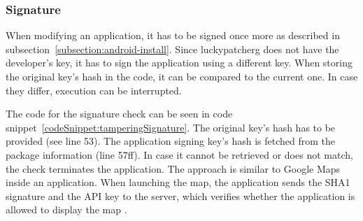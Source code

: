 \subsubsection{Signature} \label{subsection:counter-improve-tampering-signature}
When modifying an application, it has to be signed once more as described in subsection~\ref{subsection:android-install}.
Since \gls{luckypatcherg} does not have the developer’s key, it has to sign the application using a different key.
\newline
When storing the original key’s hash in the code, it can be compared to the current one.
In case they differ, execution can be interrupted.
\newline

The code for the signature check can be seen in code snippet~\ref{codeSnippet:tamperingSignature}.
The original key’s hash has to be provided (see line 53).
The application signing key’s hash is fetched from the package information (line 57ff).
In case it cannot be retrieved or does not match, the check terminates the application.
\newline
The approach is similar to Google Maps inside an application.
When launching the map, the application sends the SHA1 signature and the API key to the server, which verifies whether the application is allowed to display the map \cite{maps}.
